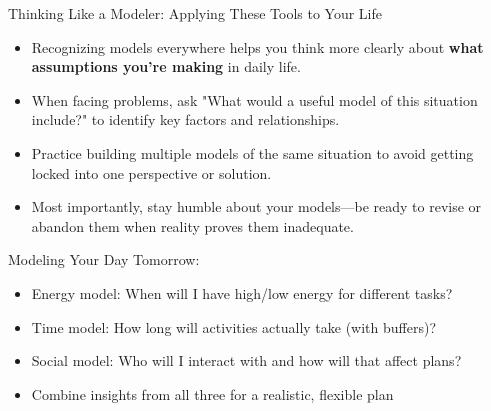 \documentclass{beamer}
\begin{document}
\begin{frame}{Thinking Like a Modeler: Applying These Tools to Your Life}
	\begin{itemize}
		\item Recognizing models everywhere helps you think more clearly about \textbf{what assumptions you're making} in daily life.
		\item When facing problems, ask "What would a useful model of this situation include?" to identify key factors and relationships.
		\item Practice building multiple models of the same situation to avoid getting locked into one perspective or solution.
		\item Most importantly, stay humble about your models—be ready to revise or abandon them when reality proves them inadequate.
	\end{itemize}
	
	\begin{example}
		\scriptsize
		Modeling Your Day Tomorrow:
		\begin{itemize}
			\item Energy model: When will I have high/low energy for different tasks?
			\item Time model: How long will activities actually take (with buffers)?
			\item Social model: Who will I interact with and how will that affect plans?
			\item Combine insights from all three for a realistic, flexible plan
		\end{itemize}
	\end{example}

\end{frame}
\end{document}
